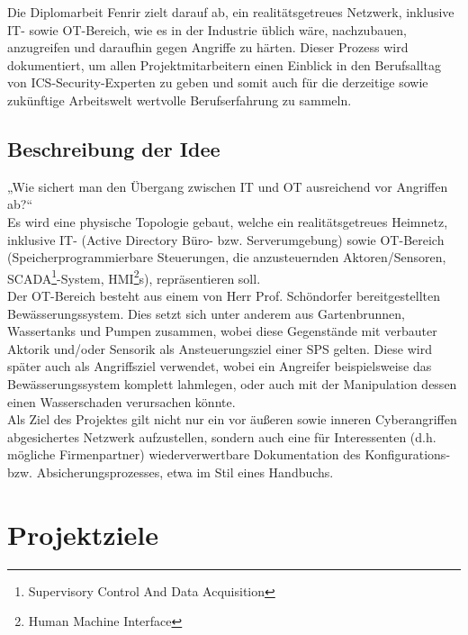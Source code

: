 \documentclass[
	headings=optiontotocandhead,%
	oneside,
	numbers=noenddot,%
	toc=flat, %
	10pt, %
	parskip=full, %
	listof=totoc, %
	listof=flat, %
	numbers=noenddot, %
	bibliography=totoc, %
	a4paper,DIV=14,
]{scrartcl}
\begin{document}
Die Diplomarbeit Fenrir zielt darauf ab, ein realitätsgetreues Netzwerk, inklusive IT- sowie OT-Bereich, wie es in der Industrie üblich wäre, nachzubauen, anzugreifen und daraufhin gegen Angriffe zu härten. Dieser Prozess wird dokumentiert, um allen Projektmitarbeitern einen Einblick in den Berufsalltag von ICS-Security-Experten zu geben und somit auch für die derzeitige sowie zukünftige Arbeitswelt wertvolle Berufserfahrung zu sammeln.

\subsection{Beschreibung der Idee}
„Wie sichert man den Übergang zwischen IT und OT ausreichend vor Angriffen ab?“ \\
Es wird eine physische Topologie gebaut, welche ein realitätsgetreues Heimnetz, inklusive IT- (Active Directory Büro- bzw. Serverumgebung) sowie OT-Bereich (Speicherprogrammierbare Steuerungen, die anzusteuernden Aktoren/Sensoren, SCADA\footnote{Supervisory Control And Data Acquisition}-System, HMI\footnote{Human Machine Interface}s), repräsentieren soll. \\
Der OT-Bereich besteht aus einem von Herr Prof. Schöndorfer bereitgestellten Bewässerungssystem. Dies setzt sich unter anderem aus Gartenbrunnen, Wassertanks und Pumpen zusammen, wobei diese Gegenstände mit verbauter Aktorik und/oder Sensorik als Ansteuerungsziel einer SPS gelten. Diese wird später auch als Angriffsziel verwendet, wobei ein Angreifer beispielsweise das Bewässerungssystem komplett lahmlegen, oder auch mit der Manipulation dessen einen Wasserschaden verursachen könnte. \\
Als Ziel des Projektes gilt nicht nur ein vor äußeren sowie inneren Cyberangriffen abgesichertes Netzwerk aufzustellen, sondern auch eine für Interessenten (d.h. mögliche Firmenpartner) wiederverwertbare Dokumentation des Konfigurations- bzw. Absicherungsprozesses, etwa im Stil eines Handbuchs.

\newpage
\section{Projektziele}
\end{document}
